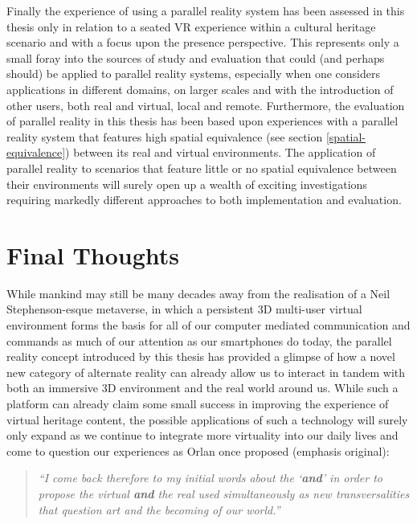 Finally the experience of using a parallel reality system has been assessed in this thesis only in relation to a seated VR experience within a cultural heritage scenario and with a focus upon the presence perspective. This represents only a small foray into the sources of study and evaluation that could (and perhaps should) be applied to parallel reality systems, especially when one considers applications in different domains, on larger scales and with the introduction of other users, both real and virtual, local and remote. Furthermore, the evaluation of parallel reality in this thesis has been based upon experiences with a parallel reality system that features high spatial equivalence (see section \ref{spatial-equivalence}) between its real and virtual environments. The application of parallel reality to scenarios that feature little or no spatial equivalence between their environments will surely open up a wealth of exciting investigations requiring markedly different approaches to both implementation and evaluation.


\section{Final Thoughts}

While mankind may still be many decades away from the realisation of a Neil Stephenson-esque metaverse, in which a persistent 3D multi-user virtual environment forms the basis for all of our computer mediated communication and commands as much of our attention as our smartphones do today, the parallel reality concept introduced by this thesis has provided a glimpse of how a novel new category of alternate reality can already allow us to interact in tandem with both an immersive 3D environment and the real world around us. While such a platform can already claim some small success in improving the experience of virtual heritage content, the possible applications of such a technology will surely only expand as we continue to integrate more virtuality into our daily lives and come to question our experiences as Orlan once proposed (emphasis original):

\begin{quote}
	\textit{``I come back therefore to my initial words about the `\textbf{and}' in order to propose the virtual \textbf{and} the real used simultaneously as new transversalities that question art and the becoming of our world.''}~\cite{Orlan2002}
\end{quote}

